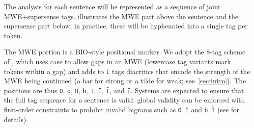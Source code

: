 \documentclass[11pt]{article}
\newcommand{\shortversion}[1]{#1}
\newcommand{\longversion}[1]{} %
\begin{document}




\longversion{To facilitate (but not require) joint sequence modeling, 
the lexical semantic}\shortversion{The} analysis for each sentence will be represented as 
a sequence of joint MWE+supersense tags.  illustrates 
the MWE part above the sentence and the supersense part below\longversion{ the sentence}; 
in practice, these will be hyphenated into a single tag per token.

The MWE portion is a BIO-style \citep{ramshaw-95} 
positional marker. We adopt the 8-tag scheme of \citet{schneider-14}, 
which uses case to allow gaps in an MWE (lowercase tag variants mark 
tokens within a gap) and adds to \texttt{I} tags 
diacritics that encode the strength of the MWE being continued (a bar for strong or a tilde for weak; see~\cref{sec:intro}).
The positions are thus \texttt{O}, \texttt{o}, \texttt{B}, \texttt{b},
\texttt{Ī}, \texttt{ī}, \texttt{Ĩ}, and \texttt{ĩ}.
Systems are expected to ensure that the full tag sequence for a sentence is valid: 
global validity can be enforced with first-order constraints 
to prohibit invalid bigrams such as \texttt{O~Ī} and \texttt{b~Ĩ} (see \citealp{schneider-14} for details).
\end{document}
